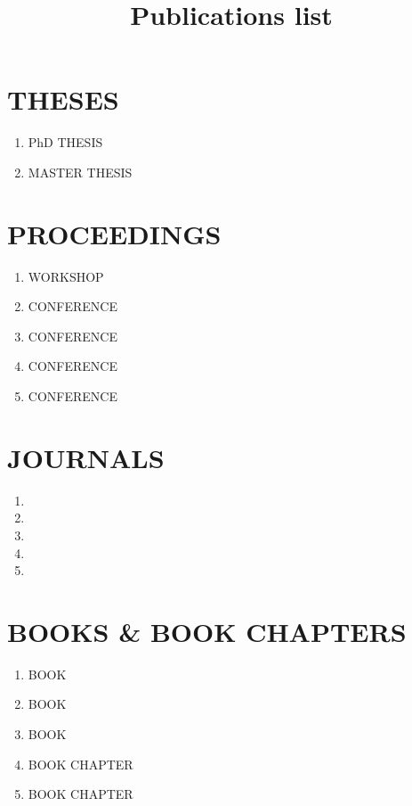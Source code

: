 \documentclass{article}
\title{Publications list}
\begin{document}
\maketitle


  \section*{THESES}
  \begin{enumerate}
    \item \colorbox{ochre}{PhD THESIS} 
    \item \colorbox{ochre}{MASTER THESIS} 
  \end{enumerate}


  \section*{PROCEEDINGS}
  \begin{enumerate}
    \item \colorbox{mayablue}{WORKSHOP} 
    \item \colorbox{mayablue}{CONFERENCE} 
    \item \colorbox{mayablue}{CONFERENCE} 
    \item \colorbox{mayablue}{CONFERENCE} 
    \item \colorbox{mayablue}{CONFERENCE} 
  \end{enumerate}
  
  \section*{JOURNALS}
  \begin{enumerate}
    \item {}
    \item {}
    \item {}
    \item {}
    \item {}
  \end{enumerate}
  
  \section*{BOOKS \& BOOK CHAPTERS}
  \begin{enumerate}
      \item \colorbox{mountainmeadow}{BOOK}  
      \item \colorbox{mountainmeadow}{BOOK} 
      \item \colorbox{mountainmeadow}{BOOK} 
      \item \colorbox{mountainmeadow}{BOOK CHAPTER} 
      \item \colorbox{mountainmeadow}{BOOK CHAPTER} 
  \end{enumerate}
\end{document}
